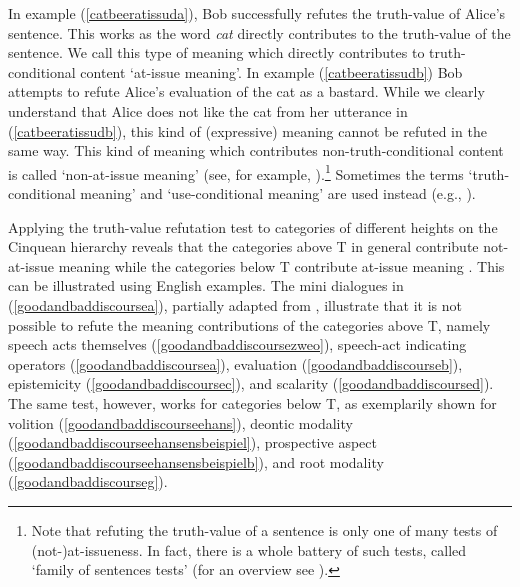 \noindent In example (\ref{catbeeratissuda}), Bob successfully refutes the truth-value of Alice's sentence. This works as the word \textit{cat} directly contributes to the truth-value of the sentence. We call this type of meaning which directly contributes to truth-conditional content `at-issue meaning'. In example (\ref{catbeeratissudb}) Bob attempts to refute Alice's evaluation of the cat as a bastard. While we clearly understand that Alice does not like the cat from her utterance in (\ref{catbeeratissudb}), this kind of (expressive) meaning cannot be refuted in the same way. This kind of meaning which contributes non-truth-conditional content is called `non-at-issue meaning' (see, for example, \citealt{karttunen1973presuppositions, simons2010projects, tonhauser2013toward, gutzmann2015use, potts2005logic}).\footnote{ Note that refuting the truth-value of a sentence is only one of many tests of (not-)at-issueness. In fact, there is a whole battery of such tests, called `family of sentences tests' (for an overview see \citealt{potts2005logic}).} Sometimes the terms `truth-conditional meaning' and `use-conditional meaning' are used instead (e.g., \citealt{gutzmann2015use}).

Applying the truth-value refutation test to categories of different heights on the Cinquean hierarchy reveals that the categories above T in general contribute not-at-issue meaning while the categories below T contribute at-issue meaning \citep{bross2017scope}. This can be illustrated using English examples. The mini dialogues in (\ref{goodandbaddiscoursea}), partially adapted from \citep[10]{bross2017scope}, illustrate that it is not possible to refute the meaning contributions of the categories above T, namely speech acts themselves (\ref{goodandbaddiscoursezweo}), speech-act indicating operators (\ref{goodandbaddiscoursea}), evaluation (\ref{goodandbaddiscourseb}), epistemicity (\ref{goodandbaddiscoursec}), and scalarity (\ref{goodandbaddiscoursed}). The same test, however, works for categories below T, as exemplarily shown for volition (\ref{goodandbaddiscourseehans}), deontic modality (\ref{goodandbaddiscourseehansensbeispiel}), prospective aspect (\ref{goodandbaddiscourseehansensbeispielb}), and root modality (\ref{goodandbaddiscourseg}).

